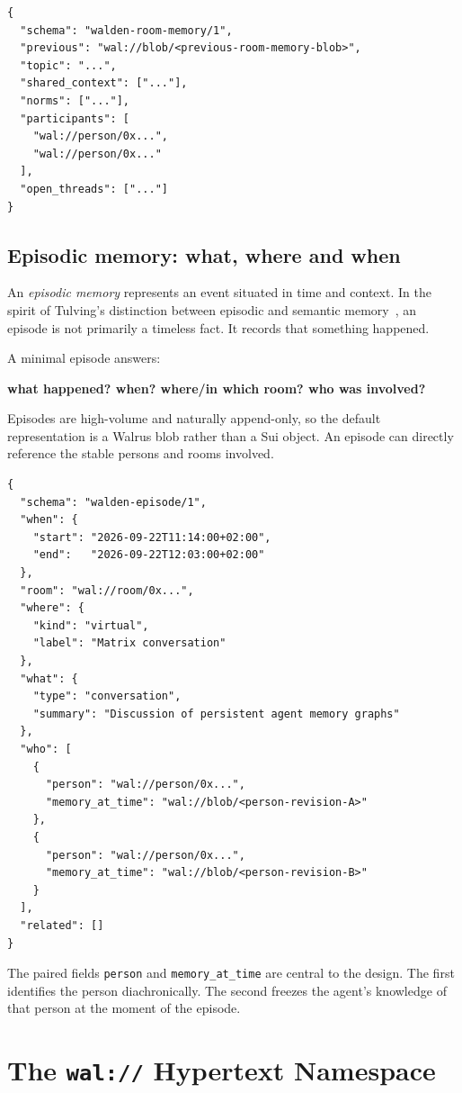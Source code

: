 \documentclass[11pt]{article}
\begin{document}
\begin{lstlisting}
{
  "schema": "walden-room-memory/1",
  "previous": "wal://blob/<previous-room-memory-blob>",
  "topic": "...",
  "shared_context": ["..."],
  "norms": ["..."],
  "participants": [
    "wal://person/0x...",
    "wal://person/0x..."
  ],
  "open_threads": ["..."]
}
\end{lstlisting}

\subsection{Episodic memory: what, where and when}

An \emph{episodic memory} represents an event situated in time and context. In the spirit of Tulving's distinction between episodic and semantic memory~\cite{tulving}, an episode is not primarily a timeless fact. It records that something happened.

A minimal episode answers:

\begin{center}
\textbf{what happened? \quad when? \quad where/in which room? \quad who was involved?}
\end{center}

Episodes are high-volume and naturally append-only, so the default representation is a Walrus blob rather than a Sui object. An episode can directly reference the stable persons and rooms involved.

\begin{lstlisting}
{
  "schema": "walden-episode/1",
  "when": {
    "start": "2026-09-22T11:14:00+02:00",
    "end":   "2026-09-22T12:03:00+02:00"
  },
  "room": "wal://room/0x...",
  "where": {
    "kind": "virtual",
    "label": "Matrix conversation"
  },
  "what": {
    "type": "conversation",
    "summary": "Discussion of persistent agent memory graphs"
  },
  "who": [
    {
      "person": "wal://person/0x...",
      "memory_at_time": "wal://blob/<person-revision-A>"
    },
    {
      "person": "wal://person/0x...",
      "memory_at_time": "wal://blob/<person-revision-B>"
    }
  ],
  "related": []
}
\end{lstlisting}

The paired fields \texttt{person} and \texttt{memory\_at\_time} are central to the design. The first identifies the person diachronically. The second freezes the agent's knowledge of that person at the moment of the episode.

\section{The \texttt{wal://} Hypertext Namespace}
\end{document}
